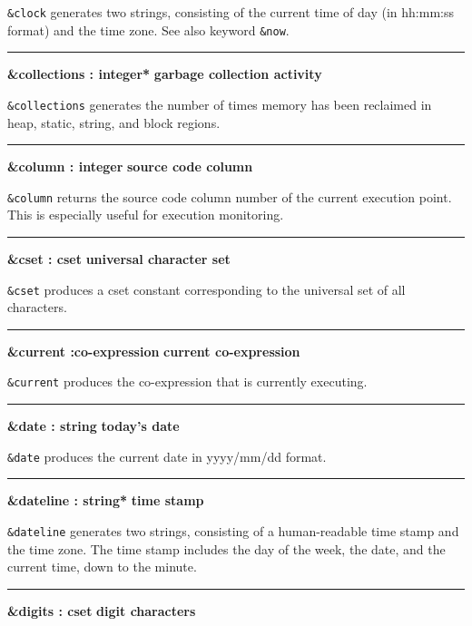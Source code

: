 \noindent
\texttt{\&clock} generates two strings, consisting of the current
time of day (in hh:mm:ss format) and the time zone.
See also keyword \texttt{\&now}.

\bigskip\hrule\vspace{0.1cm}
\noindent
{\bf \&collections : integer* } \hfill {\bf garbage collection activity}

\noindent
{}\texttt{\&collections} generates the number of
times memory has been reclaimed in heap, static, string, and block
regions.

\bigskip\hrule\vspace{0.1cm}
\noindent
{\bf \&column : integer } \hfill {\bf source code column}

\noindent
\texttt{\&column} returns the source code
column number of the current execution point. This
is especially useful for execution monitoring.

\bigskip\hrule\vspace{0.1cm}
\noindent
{\bf \&cset : cset } \hfill {\bf universal character set}

\noindent
{}\texttt{\&cset} produces a cset constant
corresponding to the universal set of all characters.

\bigskip\hrule\vspace{0.1cm}
\noindent
{\bf \&current :co{}-expression } \hfill {\bf current co{}-expression}

\noindent
{}\texttt{\&current} produces the
co-expression that is currently executing.

\bigskip\hrule\vspace{0.1cm}
\noindent
{\bf \&date : string } \hfill {\bf today's date}

\noindent
{}\texttt{\&date} produces the current
date in yyyy/mm/dd format.

\bigskip\hrule\vspace{0.1cm}
\noindent
{\bf \&dateline : string* } \hfill {\bf time stamp}

\noindent
{}\texttt{\&dateline} generates two strings, consisting of a human-readable time
stamp and the time zone. The time stamp includes the day of the week, the date, and the current
time, down to the minute.

\bigskip\hrule\vspace{0.1cm}
\noindent
{\bf \&digits : cset } \hfill {\bf digit characters}

